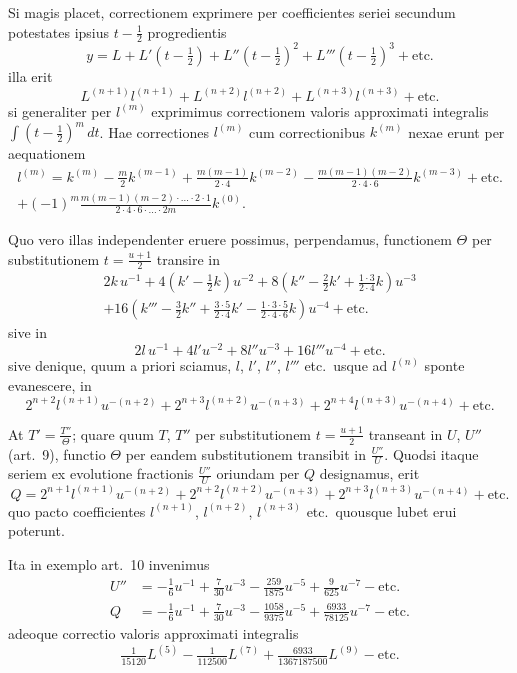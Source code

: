 \documentclass[12pt,a4paper]{article}
\begin{document}
Si magis placet, correctionem exprimere per coefficientes seriei secundum potestates ipsius $t-\frac{1}{2}$ progredientis
\[
y = L + L'(t-\tfrac{1}{2}) + L''(t-\tfrac{1}{2})^2 + L'''(t-\tfrac{1}{2})^3 + \text{etc.}
\]
illa erit
\[
L^{(n+1)}l^{(n+1)} + L^{(n+2)}l^{(n+2)} + L^{(n+3)}l^{(n+3)} + \text{etc.}
\]
si generaliter per $l^{(m)}$ exprimimus correctionem valoris approximati integralis $\int\!(t-\frac{1}{2})^m\,dt$. Hae correctiones $l^{(m)}$ cum correctionibus $k^{(m)}$ nexae erunt per aequationem
\begin{multline*}
l^{(m)} = k^{(m)} - \frac{m}{2}k^{(m-1)} + \frac{m(m-1)}{2\cdot4}k^{(m-2)} - \frac{m(m-1)(m-2)}{2\cdot4\cdot6}k^{(m-3)} + \text{etc.}\\
+ (-1)^m\frac{m(m-1)(m-2)\cdot\ldots\cdot2\cdot1}{2\cdot4\cdot6\cdot\ldots\cdot2m}k^{(0)}.
\end{multline*}

Quo vero illas independenter eruere possimus, perpendamus, functionem $\Theta$ per substitutionem $t=\frac{u+1}{2}$ transire in
\begin{multline*}
2k\,u^{-1} + 4(k'-\tfrac{1}{2}k)u^{-2} + 8(k''-\tfrac{2}{2}k'+\tfrac{1\cdot3}{2\cdot4}k)u^{-3}\\
+ 16(k'''-\tfrac{3}{2}k''+\tfrac{3\cdot5}{2\cdot4}k'-\tfrac{1\cdot3\cdot5}{2\cdot4\cdot6}k)u^{-4} + \text{etc.}
\end{multline*}
sive in
\[
2l\,u^{-1} + 4l'u^{-2} + 8l''u^{-3} + 16l'''u^{-4} + \text{etc.}
\]
sive denique, quum a priori sciamus, $l$, $l'$, $l''$, $l'''$ etc.\ usque ad $l^{(n)}$ sponte evanescere, in
\[
2^{n+2}l^{(n+1)}u^{-(n+2)} + 2^{n+3}l^{(n+2)}u^{-(n+3)} + 2^{n+4}l^{(n+3)}u^{-(n+4)} + \text{etc.}
\]

At $T' = \frac{T''}{\Theta}$; quare quum $T$, $T''$ per substitutionem $t=\frac{u+1}{2}$ transeant in $U$, $U''$ (art.\ 9), functio $\Theta$ per eandem substitutionem transibit in $\frac{U''}{U}$. Quodsi itaque seriem ex evolutione fractionis $\frac{U''}{U}$ oriundam per $Q$ designamus, erit
\[
Q = 2^{n+1}l^{(n+1)}u^{-(n+2)} + 2^{n+2}l^{(n+2)}u^{-(n+3)} + 2^{n+3}l^{(n+3)}u^{-(n+4)} + \text{etc.}
\]
quo pacto coefficientes $l^{(n+1)}$, $l^{(n+2)}$, $l^{(n+3)}$ etc.\ quousque lubet erui poterunt.

Ita in exemplo art.\ 10 invenimus
\begin{align*}
U'' &= -\tfrac{1}{6}u^{-1} + \tfrac{7}{30}u^{-3} - \tfrac{259}{1875}u^{-5} + \tfrac{9}{625}u^{-7} - \text{etc.}\\
Q &= -\tfrac{1}{6}u^{-1} + \tfrac{7}{30}u^{-3} - \tfrac{1058}{9375}u^{-5} + \tfrac{6933}{78125}u^{-7} - \text{etc.}
\end{align*}
adeoque correctio valoris approximati integralis
\[
\tfrac{1}{15120}L^{(5)} - \tfrac{1}{112500}L^{(7)} + \tfrac{6933}{1367187500}L^{(9)} - \text{etc.}
\]
\end{document}
